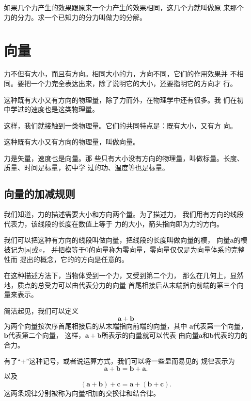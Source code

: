\begin{definition}
    如果几个力产生的效果跟原来一个力产生的效果相同，这几个力就叫做原
    来那个力的分力。求一个已知力的分力叫做力的分解。
\end{definition}

\section{向量}
力不但有大小，而且有方向。相同大小的力，方向不同，它们的作用效果并
不相同。要把一个力完全表达出来，除了说明它的大小，还要指明它的方向才
行。

这种既有大小又有方向的物理量，除了力而外，在物理学中还有很多。我
们在初中学过的速度也是这类物理量。

这样，我们就接触到一类物理量。它们的共同特点是：既有大小，又有方
向。\begin{definition}
    这种既有大小又有方向的物理量，叫做向量。
\end{definition}

力是矢量，速度也是向量。那
些只有大小没有方向的物理量，叫做标量。长度、质量、时间是标量，初中学
过的功、温度等也是标量。
\subsection{向量的加减规则}
我们知道，力的描述需要大小和方向两个量。为了描述力，
我们用有方向的线段代表力，该线段的长度在数值上等于
力的大小，箭头指向即为力的方向。

我们可以把这种有方向的线段叫做向量，把线段的长度叫做向量的模，
向量$\boldsymbol{a}$的模被记为$|\boldsymbol{a} | $或$a$，
并把模等于0的向量称为零向量，零向量仅仅是为向量体系的完整性而
提出的概念，它的的方向是任意的。

在这种描述方法下，当物体受到一个力，又受到第二个力，
那么在几何上，显然地，质点的总受力可以由代表分力的向量
首尾相接后从末端指向前端的第三个向量来表示。

\begin{definition}
    简洁起见，我们可以定义
    \begin{equation}
        \boldsymbol{a}+\boldsymbol{b}
    \end{equation}
    为两个向量按次序首尾相接后的从末端指向前端的向量，其中
    $\boldsymbol{a}$代表第一个向量，$\boldsymbol{b}$代表第二个向量，
    这样，$\boldsymbol{a}+\boldsymbol{b}$所表示的向量就可以代表
    由向量$\boldsymbol{a}$和$\boldsymbol{b}$代表的力的合力。
\end{definition}

有了“$+$”这种记号，或者说运算方式，我们可以将一些显而易见的
规律表示为
\begin{equation}
    \boldsymbol{a}+\boldsymbol{b}=
    \boldsymbol{b}+\boldsymbol{a}.
\end{equation}
以及
\begin{equation}
    (\boldsymbol{a}+\boldsymbol{b})+\boldsymbol{c}=
    \boldsymbol{a}+(\boldsymbol{b}+\boldsymbol{c}).
\end{equation}
这两条规律分别被称为向量相加的交换律和结合律。

